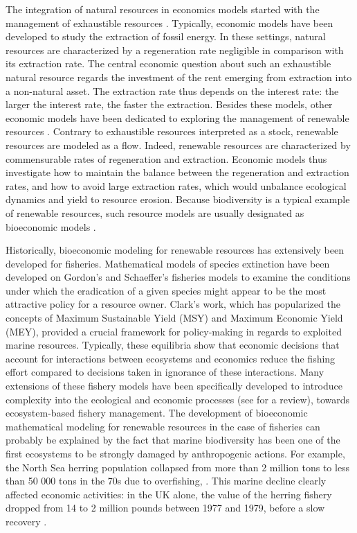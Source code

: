 The integration of natural resources in economics models started with the management of exhaustible resources \citep{Hotelling31, DasguptaHeal74}. Typically, economic models have been developed to study the extraction of fossil energy. In these settings, natural resources are characterized by a regeneration rate negligible in comparison with its extraction rate. The central economic question about such an exhaustible natural resource regards the investment of the rent emerging from extraction into a non-natural asset. The extraction rate thus depends on the interest rate: the larger the interest rate, the faster the extraction.
Besides these models, other economic models have been dedicated to exploring the management of renewable resources \citep{Smith68,Plourde70,Samuelson73}.
Contrary to exhaustible resources interpreted as a stock, renewable resources are modeled as a flow. Indeed, renewable resources are characterized by commensurable rates of regeneration and extraction. Economic models thus investigate how to maintain the balance between the regeneration and extraction rates, and how to avoid large extraction rates, which would unbalance ecological dynamics and yield to resource erosion.
Because biodiversity is a typical example of renewable resources, such resource models are usually designated as bioeconomic models \citep{Gordon1954,Scott55}.

Historically, bioeconomic modeling for renewable resources \citep{Clark73,Kontoleon2007} has extensively been developed for fisheries. Mathematical models of species extinction have been developed on Gordon's and Schaeffer's fisheries models \citep{Gordon1954, Schaefer1954}  to examine the conditions under which the eradication of a given species might appear to be the most attractive policy for a resource owner. Clark's work, which has popularized the concepts of Maximum Sustainable Yield (MSY) and Maximum Economic Yield (MEY), provided a crucial framework for policy-making in regards to exploited marine resources. Typically, these equilibria show that economic decisions that account for interactions between ecosystems and economics reduce the fishing effort compared to decisions taken in ignorance of these interactions. Many extensions of these fishery models have been specifically developed to introduce complexity into the ecological and economic processes (see \cite{Foley2012} for a review), towards ecosystem-based fishery management. 
The development of bioeconomic mathematical modeling for renewable resources in the case of fisheries can probably be explained by the fact that marine biodiversity has been one of the first ecosystems to be strongly damaged by anthropogenic actions. For example, the North Sea herring population collapsed from more than 2 million tons to less than 50 000 tons in the 70s due to overfishing, \citep{nash2005report}. This marine decline clearly affected economic activities: in the UK alone, the value of the herring fishery dropped from 14 to 2 million pounds between 1977 and 1979, before a slow recovery  \citep{wood1984report}.

